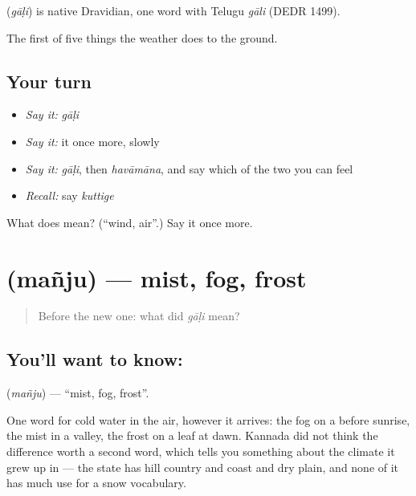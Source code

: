 \begin{cousinweb}
\textbf{} (\emph{gāḷi}) is native Dravidian, one word with Telugu \emph{gāli} (DEDR 1499).
\end{cousinweb}

\begin{grammarlens}[title={What you've built}]
The first of five things the weather does to the ground.
\end{grammarlens}

\subsection*{Your turn}
\begin{itemize}
\raggedright
  \item \emph{Say it:} \emph{gāḷi}
  \item \emph{Say it:} it once more, slowly
  \item \emph{Say it:} \emph{gāḷi}, then \emph{havāmāna}, and say which of the two you can feel
  \item \emph{Recall:} say \emph{kuttige}
\end{itemize}

\begin{tcolorbox}[breakable,colback=teal!4,colframe=teal!35!black,title={Before you move on}]
What does  mean? (\textquotedblleft{}wind, air\textquotedblright{}.) Say it once more.
\end{tcolorbox}
\section[\texorpdfstring{\kn{ಮಂಜು} (mañju)}{ಮಂಜು (mañju)}]{ (mañju) — mist, fog, frost}

\label{lesson:KA-C59-mist}



\begin{quote}
Before the new one: what did \emph{gāḷi} mean?
\end{quote}

\subsection*{You'll want to know: }
\textbf{} (\emph{mañju}) — \textquotedblleft{}mist, fog, frost\textquotedblright{}.

One word for cold water in the air, however it arrives: the fog on a  before sunrise, the mist in a valley, the frost on a leaf at dawn. Kannada did not think the difference worth a second word, which tells you something about the climate it grew up in — the state has hill country and coast and dry plain, and none of it has much use for a snow vocabulary.

